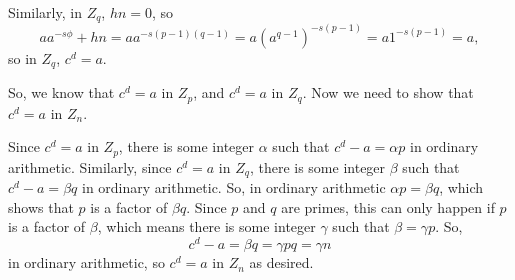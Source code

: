 Similarly, in $Z_q$, $hn=0$, so
$$
a a^ {-s \phi } +hn  = a a ^ {-s (p-1)(q-1)} = a(a^{q-1})^{-s(p-1)} =  a 1^{-s(p-1)} = a,
$$
so in $Z_q$, $c^d = a$.
\medskip

So, we know that $ c^d = a $ in $Z_p$, and $c^d = a$ in $Z_q$.  Now we need to show that
$c^d = a$ in $Z_n$.
\medskip

Since $c^d = a$ in $Z_p$, there is some integer $\alpha$ such that $c^d-a = \alpha p$
in ordinary arithmetic.
Similarly, since $c^d=a$ in $Z_q$, there is some integer $\beta$ such that $c^d-a = \beta q$
in ordinary arithmetic.
So, in ordinary arithmetic $\alpha p = \beta q$, which shows that
$p$ is a factor of $\beta q$.
Since $p$ and $q$ are primes, this can only happen if $p$ is a factor of $\beta$, which means there
is some integer $\gamma$ such that $\beta = \gamma p$.
So,
$$
c^d-a = \beta q = \gamma p q = \gamma n
$$
in ordinary arithmetic,
so $c^d = a$ in $Z_n$ as desired.
\border

 \vfil\eject
 \bye
